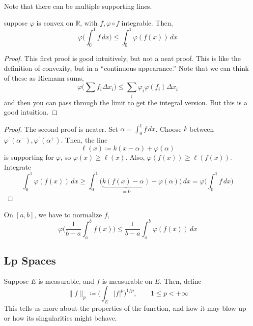   Note that there can be multiple supporting lines. 

  \begin{theorem}
    suppose $\varphi$ is convex on $\mathbb{R}$, with $f, \varphi \circ f$ integrable. Then, 
    \begin{equation}
      \varphi \bigg( \int_0^1 f \,dx \bigg) \leq \int_0^1 \varphi (f(x)) \,dx
    \end{equation}
  \end{theorem}
  \begin{proof}
    This first proof is good intuitively, but not a neat proof.  This is like the definition of convexity, but in a ``continuous  appearance.'' Note that we can think of these as Riemann sums, 
    \begin{equation}
      \varphi \bigg( \sum f_i \Delta x_i \bigg) \leq \sum_{i} \varphi_i \varphi(f_i) \Delta x_i
    \end{equation}
    and then you can pass through the limit to get the integral version. But this is a good intuition. 
  \end{proof}
  \begin{proof}
    The second proof is neater. Set $\alpha = \int_0^1 f\,dx$. Choose $k$ between $\varphi^\prime (\alpha^-), \varphi^\prime (\alpha^+)$. Then, the line 
    \begin{equation}
      \ell(x) \coloneqq k (x - \alpha) + \varphi(\alpha) 
    \end{equation}
    is supporting for $\varphi$, so $\varphi(x) \geq \ell(x)$. Also, $\varphi(f(x)) \geq \ell (f(x))$. Integrate 
    \begin{equation}
      \int_0^1 \varphi (f(x)) \,dx \geq \int_0^1 \Big( \underbrace{k (f(x) - \alpha)}_{= 0} + \varphi(\alpha) \Big) \,dx = \varphi \bigg( \int_0^1 f\,dx \bigg)
    \end{equation}
  \end{proof} 

  On $[a, b]$, we have to normalize $f$, 
  \begin{equation}
    \varphi \bigg( \frac{1}{b - a} \int_a^b f(x) \bigg) \leq \frac{1}{b - a} \int_a^b \varphi (f(x)) \,dx
  \end{equation}

\subsection{Lp Spaces}

  Suppose $E$ is measurable, and $f$ is measurable on $E$. Then, define 
  \begin{equation}
    \|f\|_p \coloneqq \bigg( \int_E |f|^p \bigg)^{1/p}, \qquad 1 \leq p < +\infty
  \end{equation} 
  This tells us more about the properties of the function, and how it may blow up or how its singularities might behave. 

